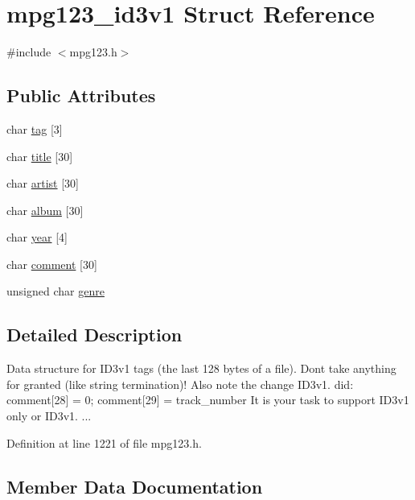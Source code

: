 \hypertarget{structmpg123__id3v1}{}\section{mpg123\+\_\+id3v1 Struct Reference}
\label{structmpg123__id3v1}


{\ttfamily \#include $<$mpg123.\+h$>$}

\subsection*{Public Attributes}
\begin{DoxyCompactItemize}
\item 
char \mbox{\hyperlink{structmpg123__id3v1_ab75ed435e357198b4316a0c86686069b}{tag}} \mbox{[}3\mbox{]}
\item 
char \mbox{\hyperlink{structmpg123__id3v1_a07f4a232c9be375fc35285538ff08c98}{title}} \mbox{[}30\mbox{]}
\item 
char \mbox{\hyperlink{structmpg123__id3v1_a1aab043e91127fd288c379e974ffc8fe}{artist}} \mbox{[}30\mbox{]}
\item 
char \mbox{\hyperlink{structmpg123__id3v1_aeef247d147c96898e25b98dbdf4eba65}{album}} \mbox{[}30\mbox{]}
\item 
char \mbox{\hyperlink{structmpg123__id3v1_a6087be9b3b25b86cafb4d59af51a1c67}{year}} \mbox{[}4\mbox{]}
\item 
char \mbox{\hyperlink{structmpg123__id3v1_a32a423f6277d64b16b655eb115233e11}{comment}} \mbox{[}30\mbox{]}
\item 
unsigned char \mbox{\hyperlink{structmpg123__id3v1_ac7fa19ffcdc1fbb8d5fbf786606baa08}{genre}}
\end{DoxyCompactItemize}


\subsection{Detailed Description}
Data structure for I\+D3v1 tags (the last 128 bytes of a file). Don\textquotesingle{}t take anything for granted (like string termination)! Also note the change I\+D3v1. did\+: comment\mbox{[}28\mbox{]} = 0; comment\mbox{[}29\mbox{]} = track\+\_\+number It is your task to support I\+D3v1 only or I\+D3v1. ... 

Definition at line 1221 of file mpg123.\+h.



\subsection{Member Data Documentation}
\mbox{\label{structmpg123__id3v1_aeef247d147c96898e25b98dbdf4eba65}} 
